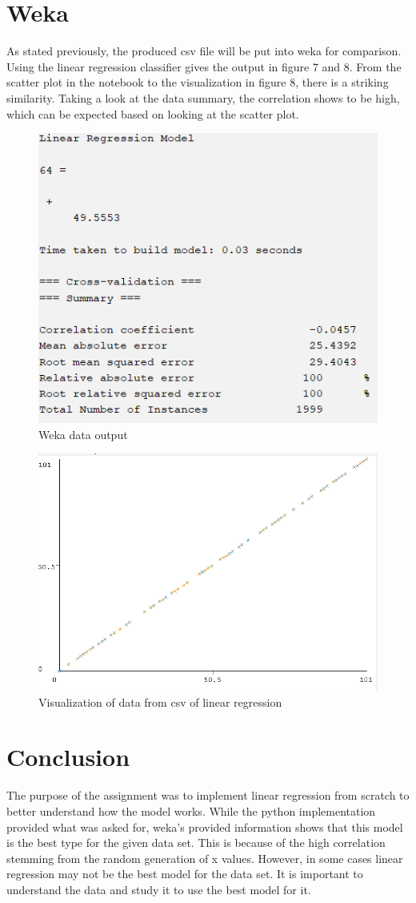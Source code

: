 \documentclass{article}
\begin{document}
\section{Weka}
As stated previously, the produced csv file will be put into weka for comparison. Using the linear regression classifier gives the output in figure 7 and 8. From the scatter plot in the notebook to the visualization in figure 8, there is a striking similarity. Taking a look at the data summary, the correlation shows to be high, which can be expected based on looking at the scatter plot.
\begin{figure}
    \centering
    \includegraphics[width=0.5\linewidth]{yuikmnbvfdertyuj.png}
    \caption{Weka data output}
    \label{fig:enter-label}
\end{figure}
\begin{figure}
    \centering
    \includegraphics[width=0.5\linewidth]{image12.png}
    \caption{Visualization of data from csv of linear regression}
    \label{fig:enter-label}
\end{figure}
\section{Conclusion}
The purpose of the assignment was to implement linear regression from scratch to better understand how the model works. While the python implementation provided what was asked for, weka's provided information shows that this model is the best type for the given data set. This is because of the high correlation stemming from the random generation of x values. However, in some cases linear regression may not be the best model for the data set. It is important to understand the data and study it to use the best model for it.
\end{document}
